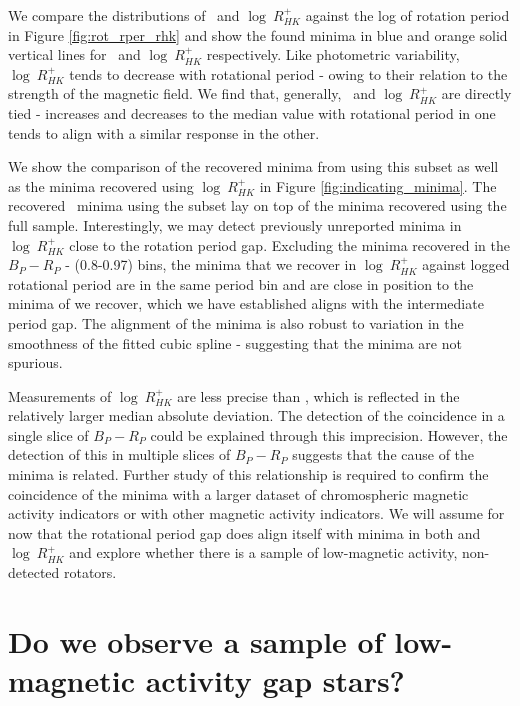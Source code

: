 We compare the distributions of \rper{} \ and $\log \ R^{+}_{HK}$ against the log of rotation period in Figure \ref{fig:rot_rper_rhk} and show the found minima in blue and orange solid vertical lines for \rper{} \ and $\log \ R^{+}_{HK}$ respectively.
Like photometric variability, $\log \ R^{+}_{HK}$ tends to decrease with rotational period - owing to their relation to the strength of the magnetic field.
We find that, generally, \rper{} \ and $\log \ R^{+}_{HK}$ are directly tied - increases and decreases to the median value with rotational period in one tends to align with a similar response in the other.

We show the comparison of the recovered minima from \rper{} using this subset as well as the minima recovered using $\log \ R^{+}_{HK}$ in Figure \ref{fig:indicating_minima}.
The recovered \rper{} \ minima using the subset lay on top of the \rper{} minima recovered using the full sample.
Interestingly, we may detect previously unreported minima in $\log \ R^{+}_{HK}$ close to the rotation period gap.
Excluding the minima recovered in the $B_P-R_P$ - (0.8-0.97) bins, the minima that we recover in $\log \ R^{+}_{HK}$ against logged rotational period are in the same period bin and are close in position to the minima of \rper{} we recover, which we have established aligns with the intermediate period gap.
The alignment of the minima is also robust to variation in the smoothness of the fitted cubic spline - suggesting that the minima are not spurious.


Measurements of $\log \ R^{+}_{HK}$ are less precise than \rper{}, which is reflected in the relatively larger median absolute deviation.
The detection of the coincidence in a single slice of $B_P-R_P$ could be explained through this imprecision.
However, the detection of this in multiple slices of $B_P-R_P$ suggests that the cause of the minima is related.
Further study of this relationship is required to confirm the coincidence of the minima with a larger dataset of chromospheric magnetic activity indicators or with other magnetic activity indicators.
We will assume for now that the rotational period gap does align itself with minima in both \rper{} and $\log \ R^{+}_{HK}$ and explore whether there is a sample of low-magnetic activity, non-detected rotators. 

\section{Do we observe a sample of low-magnetic activity gap stars?}
\label{sec:low_activity_gap}


